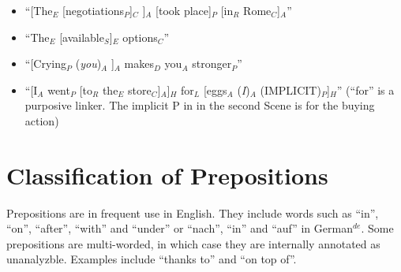 \documentclass[11pt]{article}
\newcommand{\german}[1]{{\color{red}#1$^{de}$}}
\newcommand{\dd}[1]{{\color{blue}{#1}}}
\newcommand{\dcom}[1]{\textit{\color{blue}{#1}}}
\newcommand{\rem}[1]{{(\it #1})}
\begin{document}
\begin{enumerate}
\begin{itemize}
\item
  ``[The$_E$ [negotiations$_P$]$_C$ ]$_A$ [took place]$_P$ [in$_R$ Rome$_C$]$_A$''
\item
  ``The$_E$ [available$_S$]$_E$ options$_C$''  
\item
 ``[Crying$_P$ \rem{you}$_A$ ]$_A$ makes$_D$ you$_A$ stronger$_P$''
 \item
 ``[I$_A$ went$_P$ [to$_R$ the$_E$ store$_C$]$_A$]$_H$ for$_L$ [eggs$_A$ \rem{I}$_A$ (IMPLICIT)$_P$]$_H$'' (``for'' is a purposive linker. The implicit P in in the second Scene is for the buying action)%
\end{itemize}


\end{enumerate}



\section{Classification of Prepositions}\label{sec:relators}

Prepositions are in frequent use in English. They include words such as ``in'', ``on'', ``after'', ``with'' and ``under'' \german{ or ``nach'', ``in'' and ``auf'' in German}.
Some prepositions are multi-worded, in which case they are internally annotated as unanalyzble. Examples include ``thanks to'' and ``on top of''.
\end{document}

